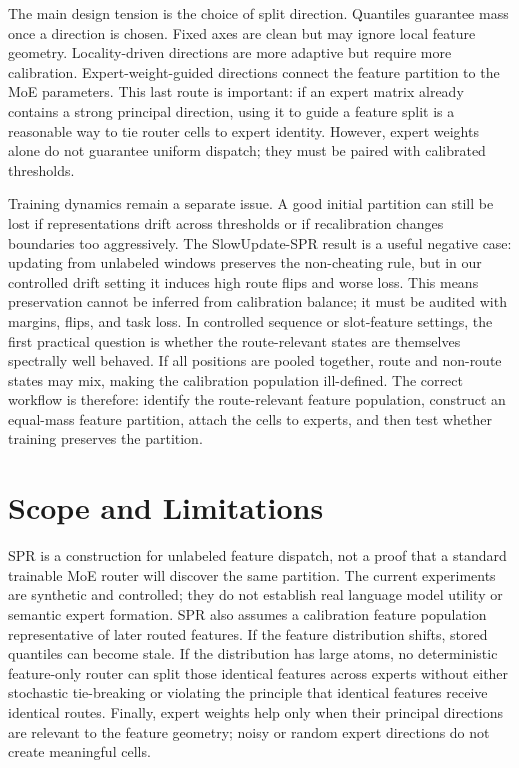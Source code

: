 \documentclass{article}
\begin{document}
The main design tension is the choice of split direction.  Quantiles guarantee
mass once a direction is chosen.  Fixed axes are clean but may ignore local
feature geometry.  Locality-driven directions are more adaptive but require more
calibration.  Expert-weight-guided directions connect the feature partition to
the MoE parameters.  This last route is important: if an expert matrix already
contains a strong principal direction, using it to guide a feature split is a
reasonable way to tie router cells to expert identity.  However, expert weights
alone do not guarantee uniform dispatch; they must be paired with calibrated
thresholds.

Training dynamics remain a separate issue.  A good initial partition can still
be lost if representations drift across thresholds or if recalibration changes
boundaries too aggressively.  The SlowUpdate-SPR result is a useful negative
case: updating from unlabeled windows preserves the non-cheating rule, but in
our controlled drift setting it induces high route flips and worse loss.  This
means preservation cannot be inferred from calibration balance; it must be
audited with margins, flips, and task loss.  In controlled sequence or
slot-feature settings, the first practical question is whether the
route-relevant states are themselves spectrally well behaved.  If all positions
are pooled together, route and non-route states may mix, making the calibration
population ill-defined.  The correct workflow is therefore: identify the
route-relevant feature population, construct an equal-mass feature partition,
attach the cells to experts, and then test whether training preserves the
partition.

\section{Scope and Limitations}

SPR is a construction for unlabeled feature dispatch, not a proof that a
standard trainable MoE router will discover the same partition.  The current
experiments are synthetic and controlled; they do not establish real language
model utility or semantic expert formation.  SPR also assumes a calibration
feature population representative of later routed features.  If the feature
distribution shifts, stored quantiles can become stale.  If the distribution has
large atoms, no deterministic feature-only router can split those identical
features across experts without either stochastic tie-breaking or violating the
principle that identical features receive identical routes.  Finally, expert
weights help only when their principal directions are relevant to the feature
geometry; noisy or random expert directions do not create meaningful cells.
\end{document}
